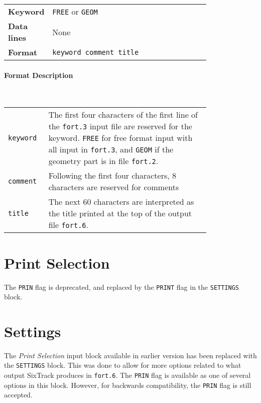 \bigskip
\begin{tabular}{@{}lp{0.8\linewidth}}
    \textbf{Keyword}    & \texttt{FREE} or \texttt{GEOM} \index{FREE}\index{GEOM}\\
    \textbf{Data lines} & None \\
    \textbf{Format}     & \texttt{keyword comment title} \\
\end{tabular}

\paragraph{Format Description}~

\bigskip
\begin{tabular}{@{}lp{0.8\linewidth}}
    \texttt{keyword} & The first four characters of the first line of the \texttt{fort.3} input file are reserved for the keyword. \texttt{FREE} for free format input with all input in \texttt{fort.3}, and \texttt{GEOM} if the geometry part is in file  \texttt{fort.2}. \\
    \texttt{comment} & Following the first four characters, 8 characters are reserved for comments \\
    \texttt{title}   & The next 60 characters are interpreted as the title printed at the top of the output file \texttt{fort.6}.
\end{tabular}

\section{Print Selection} \label{PriSel}

The \texttt{PRIN} flag is deprecated, and replaced by the \texttt{PRINT} flag in the \texttt{SETTINGS} block.

\section{Settings} \label{STSett}

The \textit{Print Selection} input block available in earlier version has been replaced with the \texttt{SETTINGS} block.
This was done to allow for more options related to what output SixTrack produces in \texttt{fort.6}.
The \texttt{PRIN} flag is available as one of several options in this block.
However, for backwards compatibility, the \texttt{PRIN} flag is still accepted.

